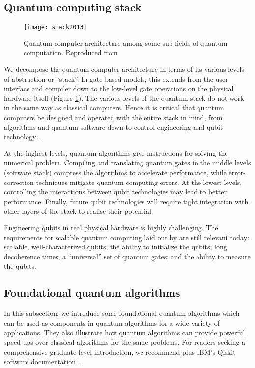 \documentclass[10pt]{iopart}
\begin{document}
\subsection{Quantum computing stack}

\begin{figure}[ht!]
\centering
\texttt{[image: stack2013]}
\caption{Quantum computer architecture among some sub-fields of quantum computation. Reproduced from \cite{vanMeter2013}}
\label{fig:stack2013}
\end{figure}

We decompose the quantum computer architecture in terms of its various levels of abstraction or ``stack''. In gate-based models, this extends from the user interface and compiler down to the low-level gate operations on the physical hardware itself (Figure \ref{fig:stack2013}). The various levels of the quantum stack do not work in the same way as classical computers. Hence it is critical that quantum computers be designed and operated with the entire stack in mind, from algorithms and quantum software down to control engineering and qubit technology \cite{Alexeev2021}. 

At the highest levels, quantum algorithms give instructions for solving the numerical problem. Compiling and translating quantum gates in the middle levels (software stack) compress the algorithms to accelerate performance, while error-correction techniques mitigate quantum computing errors. At the lowest levels, controlling the interactions between qubit technologies may lead to better performance. Finally, future qubit technologies will require tight integration with other layers of the stack to realise their potential. 

Engineering qubits in real physical hardware is highly challenging.  The requirements for scalable quantum computing laid out by \citeauthor{DiVincenzo2000} \cite{DiVincenzo2000} are still relevant today: 
scalable, well-characterized qubits;
the ability to initialize the qubits;
long decoherence times;
a ``universal'' set of quantum gates;
and the ability to measure the qubits.


\subsection{Foundational quantum algorithms}

In this subsection, we introduce some foundational quantum algorithms which can be used as components in quantum algorithms for a wide variety of applications. They also illustrate how quantum algorithms can provide powerful speed ups over classical algorithms for the same problems.  For readers seeking a comprehensive graduate-level introduction, we recommend \cite{Abhijith2022,Portugal2022,Nielsen2010} plus IBM's Qiskit software documentation \cite{Qiskit}.
\end{document}
